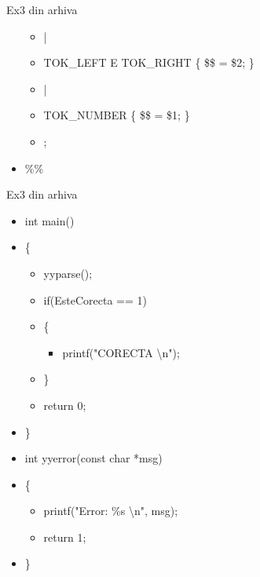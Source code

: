 \documentclass[pdf]{beamer}
\begin{document}
\begin{frame}{Ex3 din arhiva}
\begin{itemize}
\begin{itemize}
				\item[]
				\scriptsize |
	
				\item[]
				\scriptsize TOK\_LEFT E TOK\_RIGHT \{ \$\$ = \$2; \}
	
				\item[]
				\scriptsize |
	
				\item[]
				\scriptsize TOK\_NUMBER \{ \$\$ = \$1; \}
	
				\item[]
				      ;
			\end{itemize}
	
		\item[]
		\scriptsize
 \%\%

\end{itemize}
\end{frame}



\begin{frame}{Ex3 din arhiva}
\begin{itemize}
	\item[]
	int main()

	\item[]
	\{

		\begin{itemize}
			\item[]
			yyparse();
				\linebreak

			\item[]
			if(EsteCorecta == 1)

			\item[]
			\{
				
				\begin{itemize}
					\item[]
					printf("CORECTA \textbackslash n");
				\end{itemize}

			\item[]
			\}
				\linebreak

			\item[]
			return 0;
		\end{itemize}

	\item[]
	\}
		\linebreak

	\item[]
	int yyerror(const char *msg)

	\item[]
	\{

		\begin{itemize}
			\item[]
			printf("Error: \%s \textbackslash n", msg);

			\item[]
			return 1;
		\end{itemize}

	\item[]
	\}

\end{itemize}
\end{frame}
\end{document}
